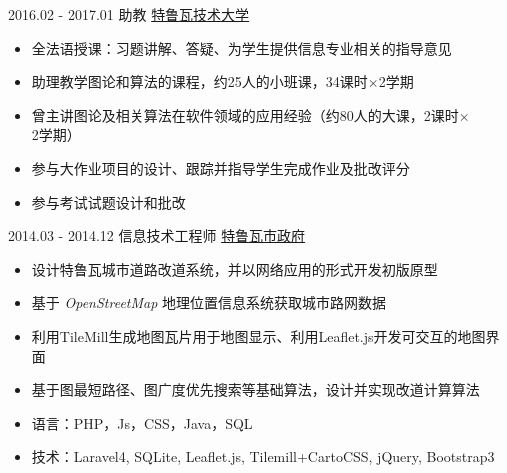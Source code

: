 \documentclass[letterpaper]{twentysecondcv} %
\begin{document}
\begin{twentyfluid}
\twentyitemfluid
    	{2016.02 - 2017.01}
        {助教}
        {\href{http://www.utt.fr/}{特鲁瓦技术大学}}
        {\\  }
        {
        {
        \vspace{-0.2cm}
        \begin{itemize}
            \item 全法语授课：习题讲解、答疑、为学生提供信息专业相关的指导意见
        	\item 助理教学图论和算法的课程，约25人的小班课，34课时$\times$2学期
        	\item 曾主讲图论及相关算法在软件领域的应用经验（约80人的大课，2课时$\times$2学期）
        	\item 参与大作业项目的设计、跟踪并指导学生完成作业及批改评分
        	\item 参与考试试题设计和批改
        \end{itemize}
        }
        }

\twentyitemfluid
        {2014.03 - 2014.12}
        {信息技术工程师}
        {\href{https://www.ville-troyes.fr/}{特鲁瓦市政府}}
        {\\   }
        {
        {
        \vspace{-0.2cm}
        \begin{itemize}
            \item 设计特鲁瓦城市道路改道系统，并以网络应用的形式开发初版原型
            \item 基于 \textit{OpenStreetMap} 地理位置信息系统获取城市路网数据
            \item 利用TileMill生成地图瓦片用于地图显示、利用Leaflet.js开发可交互的地图界面
            \item 基于图最短路径、图广度优先搜索等基础算法，设计并实现改道计算算法
            \item 语言：PHP，Js，CSS，Java，SQL
            \item 技术：Laravel4, SQLite, Leaflet.js, Tilemill+CartoCSS, jQuery, Bootstrap3
        \end{itemize}
        }
        }


\end{twentyfluid}
\end{document}

